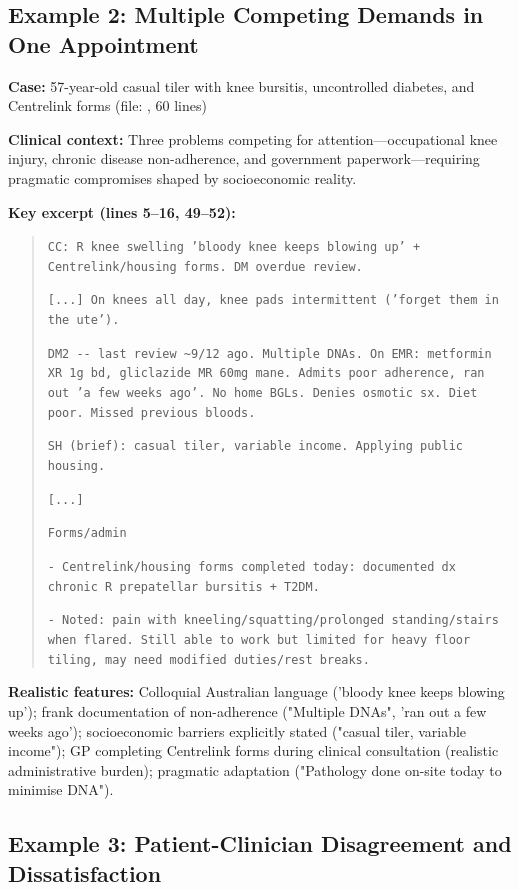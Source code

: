 \documentclass[11pt]{article}
\begin{document}
\subsection{Example 2: Multiple Competing Demands in One Appointment}

\textbf{Case:} 57-year-old casual tiler with knee bursitis, uncontrolled diabetes, and Centrelink forms (file: , 60 lines)

\textbf{Clinical context:} Three problems competing for attention—occupational knee injury, chronic disease non-adherence, and government paperwork—requiring pragmatic compromises shaped by socioeconomic reality.

\textbf{Key excerpt (lines 5--16, 49--52):}
\begin{quote}
\small
\texttt{CC: R knee swelling 'bloody knee keeps blowing up' + Centrelink/housing forms. DM overdue review.}

\texttt{[...] On knees all day, knee pads intermittent ('forget them in the ute').}

\texttt{DM2 {-}{-} last review \textasciitilde 9/12 ago. Multiple DNAs. On EMR: metformin XR 1g bd, gliclazide MR 60mg mane. Admits poor adherence, ran out 'a few weeks ago'. No home BGLs. Denies osmotic sx. Diet poor. Missed previous bloods.}

\texttt{SH (brief): casual tiler, variable income. Applying public housing.}

\texttt{[...]}

\texttt{Forms/admin}

\texttt{- Centrelink/housing forms completed today: documented dx chronic R prepatellar bursitis + T2DM.}

\texttt{- Noted: pain with kneeling/squatting/prolonged standing/stairs when flared. Still able to work but limited for heavy floor tiling, may need modified duties/rest breaks.}
\end{quote}

\textbf{Realistic features:} Colloquial Australian language ('bloody knee keeps blowing up'); frank documentation of non-adherence ("Multiple DNAs", 'ran out a few weeks ago'); socioeconomic barriers explicitly stated ("casual tiler, variable income"); GP completing Centrelink forms during clinical consultation (realistic administrative burden); pragmatic adaptation ("Pathology done on-site today to minimise DNA").

\subsection{Example 3: Patient-Clinician Disagreement and Dissatisfaction}
\end{document}
